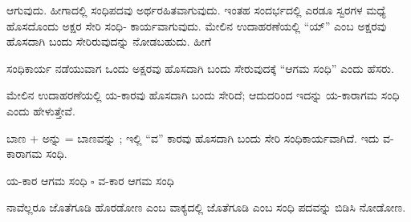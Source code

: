 \kbvcontinued ಆಗುವುದು. ಹೀಗಾದಲ್ಲಿ ಸಂಧಿಪದವು ಅರ್ಥರಹಿತವಾಗುವುದು. ಇಂತಹ ಸಂದರ್ಭದಲ್ಲಿ ಎರಡೂ ಸ್ವರಗಳ ಮಧ್ಯೆ ಹೊಸದೊಂದು ಅಕ್ಷರ ಸೇರಿ ಸಂಧಿ- ಕಾರ್ಯವಾಗುವುದು. ಮೇಲಿನ ಉದಾಹರಣೆಯಲ್ಲಿ “ಯ್” ಎಂಬ ಅಕ್ಷರವು ಹೊಸದಾಗಿ ಬಂದು ಸೇರಿರುವುದನ್ನು ನೋಡಬಹುದು. ಹೀಗೆ\par

\indent ಸಂಧಿಕಾರ್ಯ ನಡೆಯುವಾಗ ಒಂದು ಅಕ್ಷರವು ಹೊಸದಾಗಿ ಬಂದು ಸೇರುವುದಕ್ಕೆ “ಆಗಮ ಸಂಧಿ” ಎಂದು ಹೆಸರು.\par

\begin{kbvnote}
\hspace{0.5em}ಮೇಲಿನ ಉದಾಹರಣೆಯಲ್ಲಿ ಯ-ಕಾರವು ಹೊಸದಾಗಿ ಬಂದು ಸೇರಿದೆ; ಆದುದರಿಂದ ಇದನ್ನು ಯ-ಕಾರಾಗಮ ಸಂಧಿ ಎಂದು ಹೇಳುತ್ತೇವೆ.
\end{kbvnote}

\indent ಬಾಣ + ಅನ್ನು = ಬಾಣವನ್ನು ; ಇಲ್ಲಿ “ವ” ಕಾರವು ಹೊಸದಾಗಿ ಬಂದು ಸೇರಿ ಸಂಧಿಕಾರ್ಯವಾಗಿದೆ. ಇದು ವ-ಕಾರಾಗಮ ಸಂಧಿ.\par

\vspace{3pt plus 2pt}\noindent\hspace*{1.2em}\par\vspace{1pt}

\begin{kbvrule}
\noindent\kbvbullet\hspace{0.5em}ಯ-ಕಾರ ಆಗಮ ಸಂಧಿ \ensuremath{\square} ವ-ಕಾರ ಆಗಮ ಸಂಧಿ
\end{kbvrule}

\begin{kbvderiv}
\vspace{4pt plus 3pt minus 1pt}
\vspace{4pt plus 3pt minus 1pt}
\end{kbvderiv}


\indent ನಾವೆಲ್ಲರೂ ಜೊತೆಗೂಡಿ ಹೊರಡೋಣ ಎಂಬ ವಾಕ್ಯದಲ್ಲಿ ಜೊತೆಗೂಡಿ ಎಂಬ ಸಂಧಿ ಪದವನ್ನು ಬಿಡಿಸಿ ನೋಡೋಣ.\par

